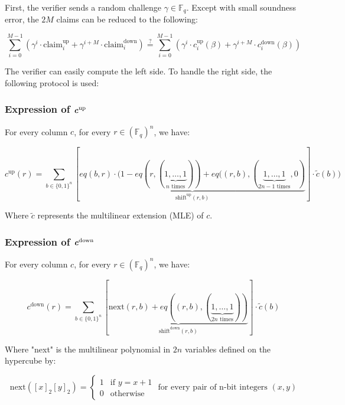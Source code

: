 \documentclass{article}
\newcommand{\Fq}{\mathbb F_q}
\begin{document}
First, the verifier sends a random challenge $\gamma \in \Fq$. Except with small soundness error, the $2M$ claims can be reduced to the following:

\begin{equation}\label{eq1}
    \sum_{i = 0}^{M-1} (\gamma^i \cdot \text{claim}^\text{up}_i + \gamma^{i+M} \cdot \text{claim}^\text{down}_i) \stackrel{?}{=} \sum_{i = 0}^{M-1} (\gamma^i \cdot c_i^{\text{up}}(\beta) + \gamma^{i+M} \cdot c_i^{\text{down}}(\beta))
\end{equation}


The verifier can easily compute the left side. To handle the right side, the following protocol is used:

\subsubsection{\texorpdfstring{Expression of $\textbf{\textit{c}}^{\text{up}}$}{}}

For every column $c$, for every $r \in (\Fq)^n$, we have:

$$c^{\text{up}}(r) = \sum_{b \in \{0, 1\}^n} [\underbrace{eq(b, r) \cdot (1 - eq(r, (\underbrace{1, \dots, 1}_{n \text{ times}})) + eq((r, b), (\underbrace{1, \dots, 1}_{2n - 1 \text{ times}}, 0)}_{\text{shift}^{\text{up}}(r, b)}] \cdot \tilde{c}(b)) $$

Where $\tilde{c}$ represents the multilinear extension (MLE) of $c$.

\subsubsection{\texorpdfstring{Expression of $\textbf{\textit{c}}^{\text{down}}$}{}}

For every column $c$, for every $r \in (\Fq)^n$, we have:

$$c^{\text{down}}(r) = \sum_{b \in \{0, 1\}^n} [\underbrace{\text{next}(r, b) +  eq((r, b), (\underbrace{1, \dots, 1}_{2n \text{ times}}))}_{\text{shift}^{\text{down}}(r, b)}] \cdot \tilde{c}(b) $$

Where "next" is the multilinear polynomial in $2n$ variables defined on the hypercube by: 

$$\text{next}([x]_2 [y]_2)  = \begin{cases}
			1 & \text{if } y = x +1\\
            0 & \text{otherwise}
		 \end{cases} \text{ for every pair of n-bit integers } (x, y)$$
\end{document}
